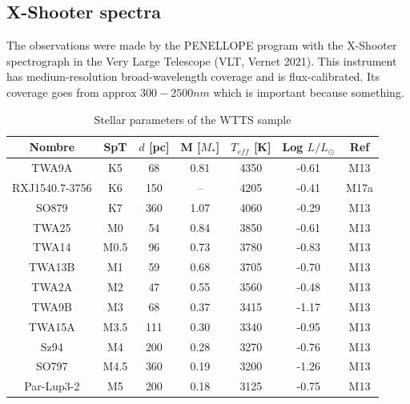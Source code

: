 \documentclass[twocolumn,linenumbers]{aastex631}
\begin{document}
\subsection{X-Shooter spectra}

The observations were made by the PENELLOPE program with the X-Shooter spectrograph in the Very Large Telescope (VLT, Vernet 2021). This instrument has medium-resolution broad-wavelength coverage and is flux-calibrated. Its coverage goes from approx $300-2500nm$  which is important because something. 

\begin{table}[]
\caption{Stellar parameters of the WTTS sample}
\centering

\begin{tabular}{ccccccc}
\hline
Nombre          & SpT  & $d$ {[}pc{]} & M {[}$M_*${]} & $T_{eff}$ {[}K{]} & Log $L/L_{\odot}$ & Ref  \\ \hline
TWA9A          & K5   & 68           & 0.81          & 4350              & -0.61             & M13  \\
RXJ1540.7-3756 & K6   & 150          & --            & 4205              & -0.41             & M17a \\
SO879          & K7   & 360          & 1.07          & 4060              & -0.29             & M13  \\
TWA25          & M0   & 54           & 0.84          & 3850              & -0.61             & M13  \\
TWA14          & M0.5 & 96           & 0.73          & 3780              & -0.83             & M13  \\
TWA13B         & M1   & 59           & 0.68          & 3705              & -0.70             & M13  \\
TWA2A          & M2   & 47           & 0.55          & 3560              & -0.48             & M13  \\
TWA9B          & M3   & 68           & 0.37          & 3415              & -1.17             & M13  \\
TWA15A         & M3.5 & 111          & 0.30          & 3340              & -0.95             & M13  \\
Sz94           & M4   & 200          & 0.28          & 3270              & -0.76             & M13  \\
SO797          & M4.5 & 360          & 0.19          & 3200              & -1.26             & M13  \\
Par-Lup3-2     & M5   & 200          & 0.18          & 3125              & -0.75             & M13  \\

\end{tabular}
\end{table}
\end{document}
